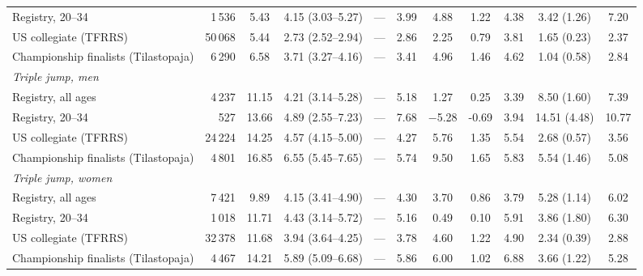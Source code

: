 \begin{tabular}{lrccccccccc}
Registry, 20--34 & 1\,536 & 5.43 & 4.15 (3.03--5.27) & --- & 3.99 & 4.88 & 1.22 & 4.38 & 3.42 (1.26) & 7.20 \\
US collegiate (TFRRS) & 50\,068 & 5.44 & 2.73 (2.52--2.94) & --- & 2.86 & 2.25 & 0.79 & 3.81 & 1.65 (0.23) & 2.37 \\
Championship finalists (Tilastopaja) & 6\,290 & 6.58 & 3.71 (3.27--4.16) & --- & 3.41 & 4.96 & 1.46 & 4.62 & 1.04 (0.58) & 2.84 \\
\multicolumn{11}{l}{\textit{Triple jump, men}} \\
Registry, all ages & 4\,237 & 11.15 & 4.21 (3.14--5.28) & --- & 5.18 & 1.27 & 0.25 & 3.39 & 8.50 (1.60) & 7.39 \\
Registry, 20--34 & 527 & 13.66 & 4.89 (2.55--7.23) & --- & 7.68 & $-$5.28 & -0.69 & 3.94 & 14.51 (4.48) & 10.77 \\
US collegiate (TFRRS) & 24\,224 & 14.25 & 4.57 (4.15--5.00) & --- & 4.27 & 5.76 & 1.35 & 5.54 & 2.68 (0.57) & 3.56 \\
Championship finalists (Tilastopaja) & 4\,801 & 16.85 & 6.55 (5.45--7.65) & --- & 5.74 & 9.50 & 1.65 & 5.83 & 5.54 (1.46) & 5.08 \\
\multicolumn{11}{l}{\textit{Triple jump, women}} \\
Registry, all ages & 7\,421 & 9.89 & 4.15 (3.41--4.90) & --- & 4.30 & 3.70 & 0.86 & 3.79 & 5.28 (1.14) & 6.02 \\
Registry, 20--34 & 1\,018 & 11.71 & 4.43 (3.14--5.72) & --- & 5.16 & 0.49 & 0.10 & 5.91 & 3.86 (1.80) & 6.30 \\
US collegiate (TFRRS) & 32\,378 & 11.68 & 3.94 (3.64--4.25) & --- & 3.78 & 4.60 & 1.22 & 4.90 & 2.34 (0.39) & 2.88 \\
Championship finalists (Tilastopaja) & 4\,467 & 14.21 & 5.89 (5.09--6.68) & --- & 5.86 & 6.00 & 1.02 & 6.88 & 3.66 (1.22) & 5.28 \\
\bottomrule
\end{tabular}
